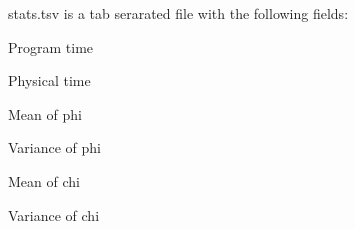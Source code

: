 stats.tsv is a tab serarated file with the following fields:

\begin{DoxyItemize}
\item Program time \item Physical time \item Mean of phi \item Variance of phi \item Mean of chi \item Variance of chi \end{DoxyItemize}
